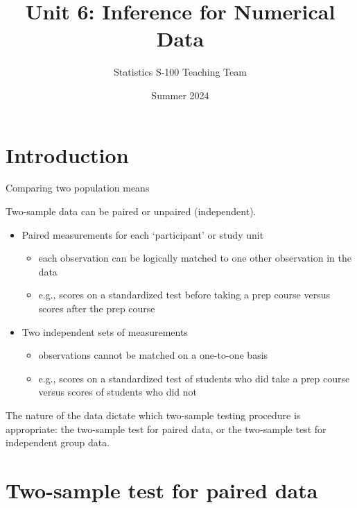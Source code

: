 \documentclass[
  ignorenonframetext,
  aspectratio=169]{beamer}
\title{Unit 6: Inference for Numerical Data}
\author{Statistics S-100 Teaching Team}
\date{Summer 2024}
\begin{document}
\frame{\titlepage}

\begin{frame}[allowframebreaks]
  \tableofcontents[hideallsubsections]
\end{frame}
\hypertarget{introduction}{%
\section{Introduction}\label{introduction}}

\begin{frame}{Comparing two population means}
\protect\hypertarget{comparing-two-population-means}{}
\small

Two-sample data can be paired or unpaired (independent).

\begin{itemize}
\item
  Paired measurements for each `participant' or study unit

  \begin{itemize}
  \item
    each observation can be logically matched to one other observation
    in the data
  \item
    e.g., scores on a standardized test before taking a prep course
    versus scores after the prep course
  \end{itemize}
\item
  Two independent sets of measurements

  \begin{itemize}
  \item
    observations cannot be matched on a one-to-one basis
  \item
    e.g., scores on a standardized test of students who did take a prep
    course versus scores of students who did not
  \end{itemize}
\end{itemize}

The nature of the data dictate which two-sample testing procedure is
appropriate: the two-sample test for paired data, or the two-sample test
for independent group data.
\end{frame}

\hypertarget{two-sample-test-for-paired-data}{%
\section{Two-sample test for paired
data}\label{two-sample-test-for-paired-data}}
\end{document}
